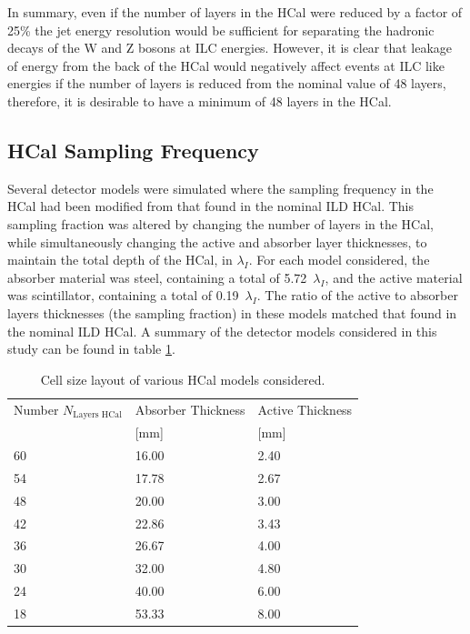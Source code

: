 In summary, even if the number of layers in the HCal were reduced by a factor of 25\% the jet energy resolution would be sufficient for separating the hadronic decays of the W and Z bosons at ILC energies.  However, it is clear that leakage of energy from the back of the HCal would negatively affect events at ILC like energies if the number of layers is reduced from the nominal value of 48 layers, therefore, it is desirable to have a minimum of 48 layers in the HCal.
  

\subsection{HCal Sampling Frequency}
\label{sec:hcalsamplingfrequency}
Several detector models were simulated where the sampling frequency in the HCal had been modified from that found in the nominal ILD HCal.  This sampling fraction was altered by changing the number of layers in the HCal, while simultaneously changing the active and absorber layer thicknesses, to maintain the total depth of the HCal, in $\lambda_{I}$.  For each model considered, the absorber material was steel, containing a total of 5.72~$\lambda_{I}$, and the active material was scintillator, containing a total of 0.19~$\lambda_{I}$.  The ratio of the active to absorber layers thicknesses (the sampling fraction) in these models matched that found in the nominal ILD HCal.  A summary of the detector models considered in this study can be found in table \ref{table:nlayershcaloption}.  

\begin{table}[h!]
\centering
\begin{tabular}{ l l l }
\hline
Number $N_{\text{Layers HCal}}$& Absorber Thickness & Active Thickness \\
 & [mm] & [mm] \\
\hline
60 & 16.00 & 2.40 \\ 
54 & 17.78 & 2.67 \\
48 & 20.00 & 3.00 \\
42 & 22.86 & 3.43 \\
36 & 26.67 & 4.00 \\
30 & 32.00 & 4.80 \\
24 & 40.00 & 6.00 \\
18 & 53.33 & 8.00 \\
\hline
\end{tabular}
\caption[Cell size layout of various HCal models considered.]{Cell size layout of various HCal models considered.}
\label{table:nlayershcaloption}
\end{table}

